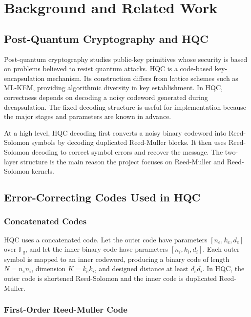 \documentclass[12pt,a4paper]{report}
\begin{document}
\chapter{Background and Related Work}

\section{Post-Quantum Cryptography and HQC}
Post-quantum cryptography studies public-key primitives whose security is based on problems believed to resist quantum attacks. HQC is a code-based key-encapsulation mechanism. Its construction differs from lattice schemes such as ML-KEM, providing algorithmic diversity in key establishment. In HQC, correctness depends on decoding a noisy codeword generated during decapsulation. The fixed decoding structure is useful for implementation because the major stages and parameters are known in advance.

At a high level, HQC decoding first converts a noisy binary codeword into Reed-Solomon symbols by decoding duplicated Reed-Muller blocks. It then uses Reed-Solomon decoding to correct symbol errors and recover the message. The two-layer structure is the main reason the project focuses on Reed-Muller and Reed-Solomon kernels.

\section{Error-Correcting Codes Used in HQC}
\subsection{Concatenated Codes}
HQC uses a concatenated code. Let the outer code have parameters \([n_e,k_e,d_e]\) over \(\mathbb{F}_q\), and let the inner binary code have parameters \([n_i,k_i,d_i]\). Each outer symbol is mapped to an inner codeword, producing a binary code of length \(N=n_en_i\), dimension \(K=k_ek_i\), and designed distance at least \(d_ed_i\). In HQC, the outer code is shortened Reed-Solomon and the inner code is duplicated Reed-Muller.



\subsection{First-Order Reed-Muller Code}
\end{document}
